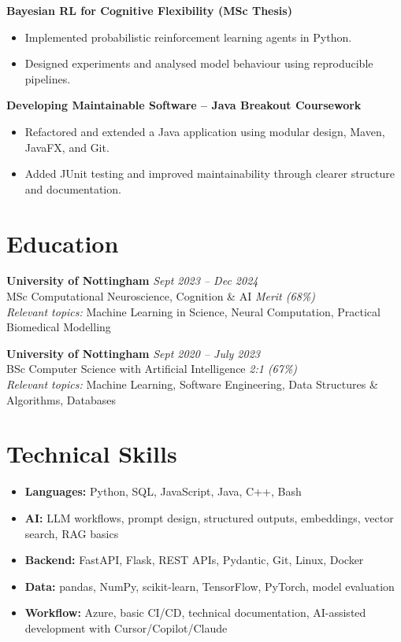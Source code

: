 \documentclass[a4paper,10pt]{article}
\begin{document}
\textbf{Bayesian RL for Cognitive Flexibility (MSc Thesis)}
\begin{itemize}
    \item Implemented probabilistic reinforcement learning agents in Python.
    \item Designed experiments and analysed model behaviour using reproducible pipelines.
\end{itemize}

\textbf{Developing Maintainable Software -- Java Breakout Coursework}
\begin{itemize}
    \item Refactored and extended a Java application using modular design, Maven, JavaFX, and Git.
    \item Added JUnit testing and improved maintainability through clearer structure and documentation.
\end{itemize}

\section*{Education}
\textbf{University of Nottingham} \hfill \textit{Sept 2023 -- Dec 2024}\\
MSc Computational Neuroscience, Cognition \& AI \hfill \textit{Merit (68\%)}\\
\textit{Relevant topics:} Machine Learning in Science, Neural Computation, Practical Biomedical Modelling

\vspace{2pt}
\textbf{University of Nottingham} \hfill \textit{Sept 2020 -- July 2023}\\
BSc Computer Science with Artificial Intelligence \hfill \textit{2:1 (67\%)}\\
\textit{Relevant topics:} Machine Learning, Software Engineering, Data Structures \& Algorithms, Databases

\section*{Technical Skills}
\begin{itemize}
    \item \textbf{Languages:} Python, SQL, JavaScript, Java, C++, Bash
    \item \textbf{AI:} LLM workflows, prompt design, structured outputs, embeddings, vector search, RAG basics
    \item \textbf{Backend:} FastAPI, Flask, REST APIs, Pydantic, Git, Linux, Docker
    \item \textbf{Data:} pandas, NumPy, scikit-learn, TensorFlow, PyTorch, model evaluation
    \item \textbf{Workflow:} Azure, basic CI/CD, technical documentation, AI-assisted development with Cursor/Copilot/Claude
\end{itemize}
\end{document}
